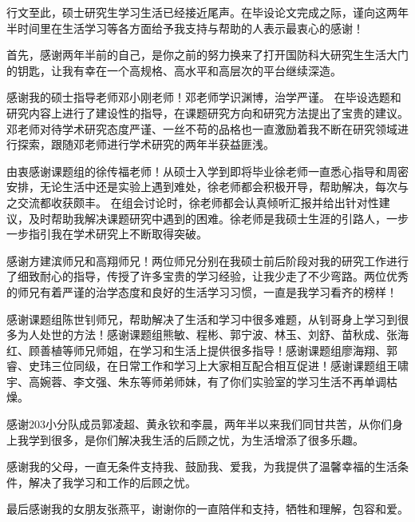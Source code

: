

\begin{ack}
行文至此，硕士研究生学习生活已经接近尾声。在毕设论文完成之际，谨向这两年半时间里在生活学习等各方面给予我支持与帮助的人表示最衷心的感谢！

首先，感谢两年半前的自己，是你之前的努力换来了打开国防科大研究生生活大门的钥匙，让我有幸在一个高规格、高水平和高层次的平台继续深造。

感谢我的硕士指导老师邓小刚老师！邓老师学识渊博，治学严谨。
在毕设选题和研究内容上进行了建设性的指导，在课题研究方向和研究方法提出了宝贵的建议。
邓老师对待学术研究态度严谨、一丝不苟的品格也一直激励着我不断在研究领域进行探索，跟随邓老师进行学术研究的两年半获益匪浅。

由衷感谢课题组的徐传福老师！从硕士入学到即将毕业徐老师一直悉心指导和周密安排，无论生活中还是实验上遇到难处，徐老师都会积极开导，帮助解决，每次与之交流都收获颇丰。
在组会讨论时，徐老师都会认真倾听汇报并给出针对性建议，及时帮助我解决课题研究中遇到的困难。徐老师是我硕士生涯的引路人，一步一步指引我在学术研究上不断取得突破。

感谢方建滨师兄和高翔师兄！两位师兄分别在我硕士前后阶段对我的研究工作进行了细致耐心的指导，传授了许多宝贵的学习经验，让我少走了不少弯路。两位优秀的师兄有着严谨的治学态度和良好的生活学习习惯，一直是我学习看齐的榜样！

感谢课题组陈世钊师兄，帮助解决了生活和学习中很多难题，从钊哥身上学习到很多为人处世的方法！感谢课题组熊敏、程彬、郭宁波、林玉、刘舒、苗秋成、张海红、顾善植等师兄师姐，在学习和生活上提供很多指导！感谢课题组廖海翔、郭睿、史玮三位同级，在日常工作和学习上大家相互配合相互促进！感谢课题组王啸宇、高婉蓉、李文强、朱东等师弟师妹，有了你们实验室的学习生活不再单调枯燥。

感谢203小分队成员郭凌超、黄永钦和李晨，两年半以来我们同甘共苦，从你们身上我学到很多，是你们解决我生活的后顾之忧，为生活增添了很多乐趣。

感谢我的父母，一直无条件支持我、鼓励我、爱我，为我提供了温馨幸福的生活条件，解决了我学习和工作的后顾之忧。

最后感谢我的女朋友张燕平，谢谢你的一直陪伴和支持，牺牲和理解，包容和爱。


\end{ack}
